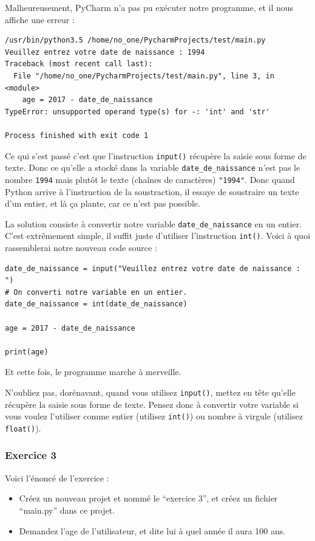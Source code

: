 \documentclass[12pt]{article}
\newcommand{\code}[1]{\colorbox{light-gray}{\texttt{#1}}}
\begin{document}
            Malheureusement, PyCharm n'a pas pu exécuter notre programme, et il nous affiche une erreur :
            \begin{lstlisting}[style=exec_result]
/usr/bin/python3.5 /home/no_one/PycharmProjects/test/main.py
Veuillez entrez votre date de naissance : 1994
Traceback (most recent call last):
  File "/home/no_one/PycharmProjects/test/main.py", line 3, in <module>
    age = 2017 - date_de_naissance
TypeError: unsupported operand type(s) for -: 'int' and 'str'

Process finished with exit code 1
            \end{lstlisting}

            Ce qui s'est passé c'est que l'instruction \code{input()} récupère la saisie sous forme de texte. Donc
            ce qu'elle a stocké dans la variable \code{date\_de\_naissance} n'est pas le nombre \code{1994} mais plutôt
            le texte (chaînes de caractères) \code{"1994"}. Donc quand Python arrive à l'instruction de la soustraction,
            il essaye de soustraire un texte d'un entier, et là ça plante, car ce n'est pas possible.

            La solution consiste à convertir notre variable \code{date\_de\_naissance} en un entier. C'est extrêmement 
            simple, il suffit juste d'utiliser l'instruction \code{int()}. Voici à quoi rassemblerai notre nouveau
            code source :
            \begin{lstlisting}[style=code, breaklines=false]
date_de_naissance = input("Veuillez entrez votre date de naissance : ")
# On converti notre variable en un entier.
date_de_naissance = int(date_de_naissance)

age = 2017 - date_de_naissance

print(age) 
            \end{lstlisting}

            Et cette fois, le programme marche à merveille. 

            N'oubliez pas, dorénavant, quand vous utilisez \code{input()},
            mettez en tête qu'elle récupère la saisie sous forme de texte. Pensez donc à convertir votre variable si 
            vous voulez l'utiliser comme entier (utilisez \code{int()}) ou nombre à virgule (utilisez \code{float()}).

        \subsubsection{Exercice 3}
            Voici l'énoncé de l'exercice :
            \begin{itemize}
                \item Créez un nouveau projet et nommé le ``exercice 3'', et créez un fichier ``main.py'' dans ce
                    projet.
                \item Demandez l'age de l'utilisateur, et dite lui à quel année il aura 100 ans.
            \end{itemize}
\end{document}
